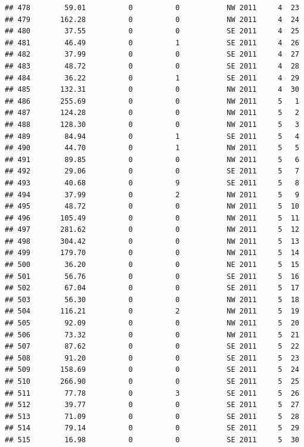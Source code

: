 \documentclass[
]{article}
\begin{document}
\begin{verbatim}
## 478        59.01          0          0           NW 2011     4  23
## 479       162.28          0          0           NW 2011     4  24
## 480        37.55          0          0           SE 2011     4  25
## 481        46.49          0          1           SE 2011     4  26
## 482        37.99          0          0           SE 2011     4  27
## 483        48.72          0          0           SE 2011     4  28
## 484        36.22          0          1           SE 2011     4  29
## 485       132.31          0          0           NW 2011     4  30
## 486       255.69          0          0           NW 2011     5   1
## 487       124.28          0          0           NW 2011     5   2
## 488       128.30          0          0           NW 2011     5   3
## 489        84.94          0          1           SE 2011     5   4
## 490        44.70          0          1           NW 2011     5   5
## 491        89.85          0          0           NW 2011     5   6
## 492        29.06          0          0           SE 2011     5   7
## 493        40.68          0          9           SE 2011     5   8
## 494        37.99          0          2           NW 2011     5   9
## 495        48.72          0          0           NW 2011     5  10
## 496       105.49          0          0           NW 2011     5  11
## 497       281.62          0          0           NW 2011     5  12
## 498       304.42          0          0           NW 2011     5  13
## 499       179.70          0          0           NW 2011     5  14
## 500        36.20          0          0           NE 2011     5  15
## 501        56.76          0          0           SE 2011     5  16
## 502        67.04          0          0           SE 2011     5  17
## 503        56.30          0          0           NW 2011     5  18
## 504       116.21          0          2           NW 2011     5  19
## 505        92.09          0          0           NW 2011     5  20
## 506        73.32          0          0           NW 2011     5  21
## 507        87.62          0          0           SE 2011     5  22
## 508        91.20          0          0           SE 2011     5  23
## 509       158.69          0          0           SE 2011     5  24
## 510       266.90          0          0           SE 2011     5  25
## 511        77.78          0          3           SE 2011     5  26
## 512        39.77          0          0           SE 2011     5  27
## 513        71.09          0          0           SE 2011     5  28
## 514        79.14          0          0           SE 2011     5  29
## 515        16.98          0          0           SE 2011     5  30

\end{verbatim}
\end{document}

